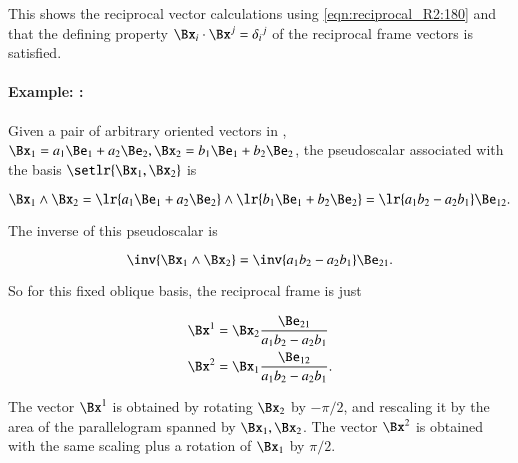 This shows the reciprocal vector calculations using \cref{eqn:reciprocal_R2:180} and that the
defining property
\( \Bx_i \cdot \Bx^j = {\delta_i}^j \)
of the reciprocal frame vectors
is satisfied.

\paragraph{Example: :}

Given a pair of arbitrary oriented vectors in , \( \Bx_1 = a_1 \Be_1 + a_2 \Be_2, \Bx_2 = b_1 \Be_1 + b_2 \Be_2 \), the pseudoscalar associated with the basis \( \setlr{ \Bx_1, \Bx_2} \) is

\begin{dmath}\label{eqn:reciprocal_R2:260}
\Bx_1 \wedge \Bx_2
=
\lr{ a_1 \Be_1 + a_2 \Be_2 } \wedge \lr{ b_1 \Be_1 + b_2 \Be_2 }
=
\lr{ a_1 b_2 - a_2 b_1 } \Be_{12}.
\end{dmath}

The inverse of this pseudoscalar is

\begin{dmath}\label{eqn:reciprocal_R2:280}
\inv{\Bx_1 \wedge \Bx_2 }
=
\inv{ a_1 b_2 - a_2 b_1 } \Be_{21}.
\end{dmath}

So for this fixed oblique  basis, the reciprocal frame is just

\begin{dmath}\label{eqn:reciprocal_R2:300}
\begin{aligned}
\Bx^1 &= \Bx_2 \frac{\Be_{21}}{ a_1 b_2 - a_2 b_1 } \\
\Bx^2 &= \Bx_1 \frac{\Be_{12}}{ a_1 b_2 - a_2 b_1 }.
\end{aligned}
\end{dmath}

The vector \( \Bx^1 \) is obtained by rotating \( \Bx_2 \) by \( -\pi/2 \), and rescaling it by the area of the parallelogram spanned by \( \Bx_1, \Bx_2 \).
The vector \( \Bx^2 \) is obtained with the same scaling plus a rotation of \( \Bx_1 \) by \( \pi/2 \).

